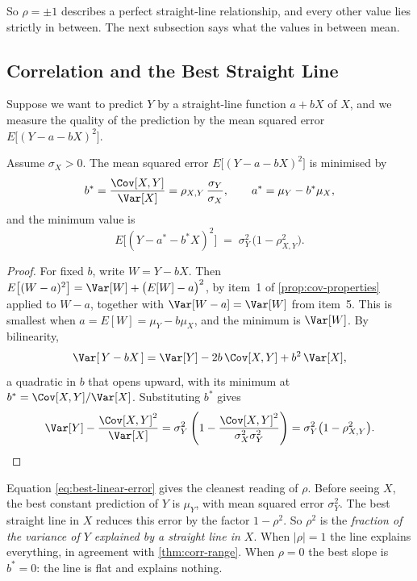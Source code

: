 So $\rho=\pm1$ describes a perfect straight-line relationship, and every other value lies strictly in between.
The next subsection says what the values in between mean.

\subsection{Correlation and the Best Straight Line}
\label{subsec:best-linear}

Suppose we want to predict $Y$ by a straight-line function $a+bX$ of $X$, and we measure the quality of the prediction by the mean squared error $E\bigl[(Y-a-bX)^{2}\bigr]$.

\begin{proposition}\label{prop:best-linear}
	Assume $\sigma_{X}>0$.
	The mean squared error $E\bigl[(Y-a-bX)^{2}\bigr]$ is minimised by
	\[
		b^{*} = \frac{\Cov[X,Y]}{\Var[X]} = \rho_{X,Y}\,\frac{\sigma_{Y}}{\sigma_{X}} ,
		\qquad
		a^{*} = \mu_{Y}-b^{*}\mu_{X} ,
	\]
	and the minimum value is
	\begin{equation}
		E\bigl[(Y-a^{*}-b^{*}X)^{2}\bigr] \;=\; \sigma_{Y}^{2}\,\bigl(1-\rho_{X,Y}^{2}\bigr) . \label{eq:best-linear-error}
	\end{equation}
\end{proposition}

\begin{proof}
	For fixed $b$, write $W=Y-bX$.
	Then $E\bigl[(W-a)^{2}\bigr]=\Var[W]+\bigl(E[W]-a\bigr)^{2}$, by item~1 of \autoref{prop:cov-properties} applied to $W-a$, together with $\Var[W-a]=\Var[W]$ from item~5.
	This is smallest when $a=E[W]=\mu_{Y}-b\mu_{X}$, and the minimum is $\Var[W]$.
	By bilinearity,
	\[
		\Var[\,Y-bX\,] = \Var[Y] - 2b\,\Cov[X,Y] + b^{2}\,\Var[X] ,
	\]
	a quadratic in $b$ that opens upward, with its minimum at $b^{*}=\Cov[X,Y]/\Var[X]$.
	Substituting $b^{*}$ gives
	\[
		\Var[Y]-\frac{\Cov[X,Y]^{2}}{\Var[X]}
		= \sigma_{Y}^{2}\left(1-\frac{\Cov[X,Y]^{2}}{\sigma_{X}^{2}\sigma_{Y}^{2}}\right)
		= \sigma_{Y}^{2}\bigl(1-\rho_{X,Y}^{2}\bigr) .
		\qedhere
	\]
\end{proof}

Equation \eqref{eq:best-linear-error} gives the cleanest reading of $\rho$.
Before seeing $X$, the best constant prediction of $Y$ is $\mu_{Y}$, with mean squared error $\sigma_{Y}^{2}$.
The best straight line in $X$ reduces this error by the factor $1-\rho^{2}$.
So $\rho^{2}$ is the \emph{fraction of the variance of $Y$ explained by a straight line in $X$}.
When $|\rho|=1$ the line explains everything, in agreement with \autoref{thm:corr-range}.
When $\rho=0$ the best slope is $b^{*}=0$: the line is flat and explains nothing.

